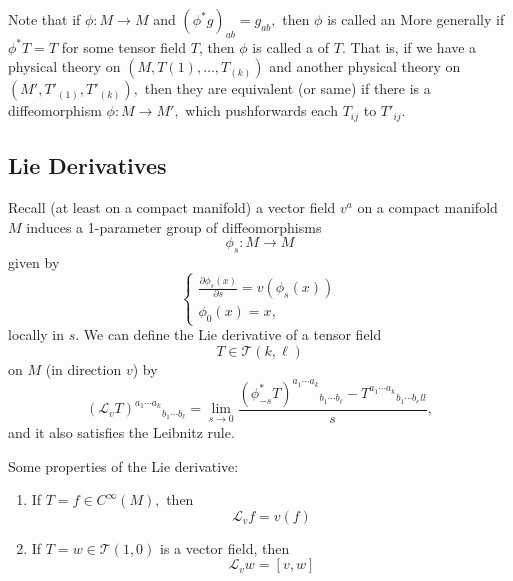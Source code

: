 \documentclass{article}
\numberwithin{equation}{section}
\begin{document}
Note that if $\phi: M\to M$ and $(\phi^*g)_{ab} = g_{ab},$ then $\phi$ is called an  More generally if $\phi^*T = T$ for some tensor field $T$, then $\phi$ is called a  of $T.$ That is, if we have a physical theory on $(M,T{(1)},\dots,T_{(k)})$ and another physical theory on $(M',T'_{(1)},T'_{(k)}),$ then they are equivalent (or same) if there is a diffeomorphism $\phi:M\to M',$ which pushforwards each $T_{ij}$ to $T'_{ij}.$ 
\subsection{Lie Derivatives}
Recall (at least on a compact manifold) a vector field $v^a$ on a compact manifold $M$ induces a 1-parameter group of diffeomorphisms
\begin{equation*}
    \phi_s: M\to M
\end{equation*}
given by 
\begin{equation*}
\begin{cases}
    \frac{\partial \phi_s(x)}{\partial s}  = v(\phi_s(x)) \\ 
    \phi_0(x) = x,
\end{cases}
\end{equation*}
locally in $s.$ We can define the Lie derivative of a tensor field 
\begin{equation*}
    T \in \mathcal{T}(k,\ell)
\end{equation*}
on $M$ (in direction $v$) by
\begin{equation*}
    (\mathcal{L}_v T)^{a_1\cdots a_k}{}_{b_1\cdots b_\ell} = \lim_{s\to 0} \frac{(\phi^*_{-s}T)^{a_1\cdots a_k}{}_{b_1\cdots b_\ell} - T^{a_1\cdots a_k}{}_{b_1\cdots b_ell}}{s},
\end{equation*}
and it also satisfies the Leibnitz rule.
\begin{lemma}
    Some properties of the Lie derivative:
    \begin{enumerate}[label=(\alph*)]
        \item If $T = f \in C^{\infty}(M),$ then 
        \begin{equation*}
            \mathcal{L}_v f = v(f)
        \end{equation*}
        \item If $T = w \in \mathcal{T}(1,0)$ is a vector field, then 
        \begin{equation*}
            \mathcal{L}_v w = [v,w]
        \end{equation*}
    \end{enumerate}
\end{lemma}
\end{document}
